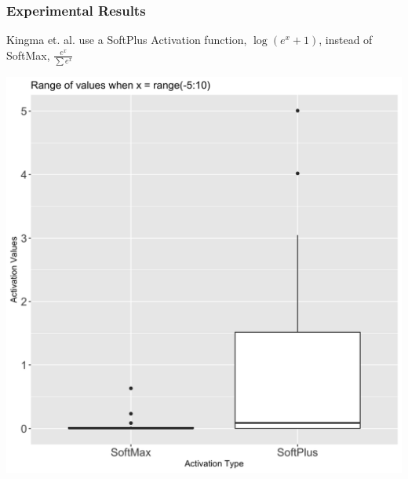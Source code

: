 \documentclass{beamer}
\begin{document}
\begin{frame}
  \frametitle{Experimental Results}

  Kingma et. al. use a SoftPlus Activation function, $\log(e^x + 1)$,
  instead of SoftMax, $\frac{e^x}{\sum e^x}$
  \begin{center}
    \includegraphics[scale=0.085]{activations}
  \end{center}
  
\end{frame}
\end{document}
